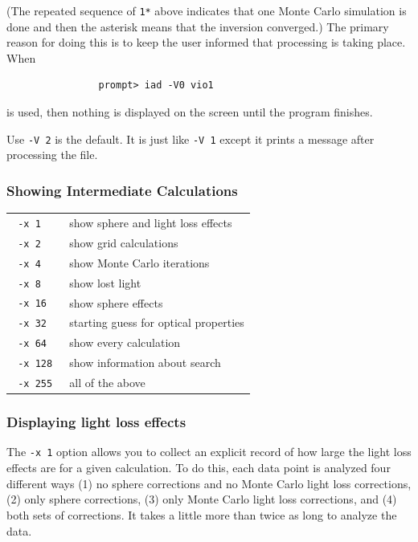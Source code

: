 \documentclass{article}
\begin{document}
\noindent
(The repeated sequence of \texttt{1*} above indicates that one Monte
Carlo simulation is done and then the asterisk means that the inversion
converged.) The primary reason for doing this is to keep the user informed that processing
is taking place.  When 
\begin{verbatim}
                prompt> iad -V0 vio1
\end{verbatim}
is used, then nothing is displayed on the screen until the program finishes.

Use \texttt{-V 2} is the default.  It is just like \texttt{-V 1} except it 
prints a message after processing the file.

\subsubsection{Showing Intermediate Calculations}

\begin{center}
\begin{tabular}{lp{7cm}}
\texttt{ -x 1                }& show sphere and light loss effects              \\
\texttt{ -x 2                }& show grid calculations             \\
\texttt{ -x 4                }& show Monte Carlo iterations              \\
\texttt{ -x 8                }& show lost light          \\
\texttt{ -x 16                }& show sphere effects              \\
\texttt{ -x 32                }& starting guess for optical properties               \\
\texttt{ -x 64                }& show every calculation              \\
\texttt{ -x 128                }& show information about search               \\
\texttt{ -x 255                }& all of the above         \\
\end{tabular}
\end{center}

\subsubsection{Displaying light loss effects}
The \texttt{-x 1} option allows you to collect an explicit record of how
large the light loss effects are for a given calculation.  To do this,
each data point is analyzed four different ways (1) no sphere corrections
and no Monte Carlo light loss corrections, (2) only sphere corrections,
(3) only Monte Carlo light loss corrections, and (4) both sets of corrections.
It takes a little more than twice as long to analyze the data.
\end{document}
